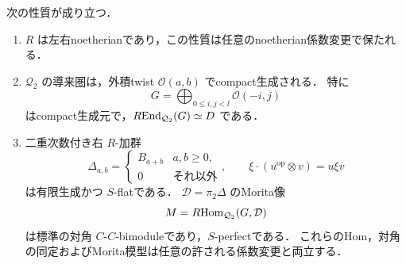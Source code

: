 \begin{lemma}\label{lem:finite-family-product-diagonal}
次の性質が成り立つ．
\begin{enumerate}
\item $R$ は左右noetherianであり，この性質は任意のnoetherian係数変更で保たれる．
\item $\mathcal Q_2$ の導来圏は，外積twist $\mathcal O(a,b)$ でcompact生成される．
特に
\[
 G=\bigoplus_{0\le i,j<l}\mathcal O(-i,j)
\]
はcompact生成元で，$R\!\operatorname{End}_{\mathcal Q_2}(G)\simeq D$ である．
\item 二重次数付き右 $R$-加群
\[
 \Delta_{a,b}=\begin{cases}B_{a+b}&a,b\ge0,\\0&\text{それ以外}\end{cases},
 \qquad \xi\cdot(u^{\mathrm{op}}\otimes v)=u\xi v
\]
は有限生成かつ $S$-flatである．
$\mathcal D=\pi_2\Delta$ のMorita像
\[
 M=R\!\operatorname{Hom}_{\mathcal Q_2}(G,\mathcal D)
\]
は標準の対角 $C$-$C$-bimoduleであり，$S$-perfectである．
これらのHom，対角の同定およびMorita模型は任意の許される係数変更と両立する．
\end{enumerate}
\end{lemma}
